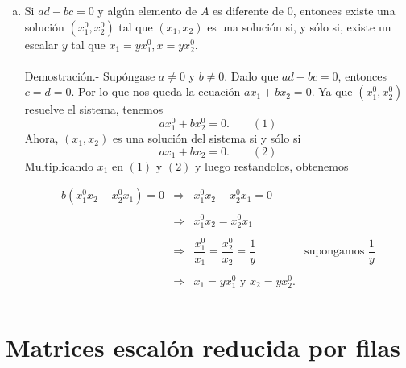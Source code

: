 \begin{enumerate}[\bfseries 1.]
\begin{enumerate}[(a)]
	    \item Si $ad-bc= 0$ y algún elemento de $A$ es diferente de $0$, entonces existe una solución $\left(x_1^0,x_2^0 \right)$ tal que $(x_1,x_2)$ es una solución si, y sólo si, existe un escalar $y$ tal que $x_1=yx_1^0, x=yx_2^0.$\\\\
		Demostración.-\; Supóngase $a\neq 0$ y $b\neq 0$. Dado que $ad-bc=0$, entonces $c=d=0$. Por lo que nos queda la ecuación $ax_1+bx_2=0$. Ya que $(x_1^0,x_2^0)$ resuelve el sistema, tenemos
		  $$ax_1^{0}+bx_2^{0}=0.\qquad (1)$$
		Ahora, $(x_1,x_2)$ es una solución del sistema si y sólo si 
		    $$ax_1+bx_2=0.\qquad (2)$$
		Multiplicando $x_1$ en $(1)$ y $(2)$ y luego restandolos, obtenemos

		$$\begin{array}{rcll}
		    b\left(x_1^0x_2-x_2^0x_1\right)=0&\Rightarrow&x_1^0x_2-x_2^0x_1=0&\\\\
						     &\Rightarrow&x_1^0x_2=x_2^0x_1&\\\\
						     &\Rightarrow&\dfrac{x_1^0}{x_1}=\dfrac{x_2^0}{x_2}=\dfrac{1}{y}&\mbox{supongamos }\dfrac{1}{y}\\\\
						     &\Rightarrow&x_1=yx_1^0 \mbox{ y } x_2=yx_2^0.\\\\
		\end{array}$$
		\vspace{0.5cm}

	\end{enumerate}

\end{enumerate}


\section{Matrices escalón reducida por filas}

